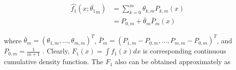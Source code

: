 \begin{comment}
As we chose Bernstein polynomial method and estimate the probability density function (PDF) $f_1(x) =F'_1(x)$ by the Bernstein estimator of $f$ of order $m > 0$ and $F_E$ denotes the empirical distribution function.

\begin{equation}
    \hat{f_1}_{m}(x) = \frac{d}{dx} \hat{F_1}_{m}=
    m\displaystyle\sum_{k=0}^{m-1}\left[F_{1 E }\left(\frac{k+1}{m}\right)-F_{1E }\left(\frac{k}{m}\right)\right] P_{k,m-1}(x)
\end{equation}

where $P_{k,m}(x) = \binom{m}{k} x^k(1-x)^{(m-k)}$ are binomial probabilities, and $F_E$ denotes as the empirical distribution function obtained. The integration of the estimator of $\hat{f_1}$ is


\begin{equation}
\hat{F_1}_{m,l}(x) = \int \hat{f_1}_{ m}(x) dx
\end{equation}

and $\hat{F_0}_{n}(x)$ is obtained similarly as  $\hat{F_1}_{m}(x)$ with $n$ of the Bernstein polynomial degree.



\begin{equation}
    \hat{f_0}_{n}(x) = \frac{d}{dx} \hat{F_0}_{n}=
    n\displaystyle\sum_{k=0}^{n-1}\theta_{k,n}\left[F_{0 E }\left(\frac{k+1}{n}\right)-F_{0E }\left(\frac{k}{n}\right)\right] P_{k,n-1}(x)
\end{equation}

$F_{0E}$ denotes as the empirical distribution of $F_0$  obtained. The integration of the estimator of $\hat{f_1}$ is


\begin{equation}
\hat{F_0}_{n}(x) = \int \hat{f_0}_{n}(x) dx
\end{equation}

\end{comment}


\begin{equation}
\begin{split}
\hat{f_1}(x;\bar{\theta_1}_m) & = \sum_{k=0}^{m}\theta_{k,m}P_{k,m}(x) \\
&= P_{0,m}+\bar{\theta}_m\bar{P}_m(x)
\end{split}
\end{equation}

where $\bar{\theta}_m = (\theta_{1,m}, ..., \theta_{m,m})^T$,  $\bar{P}_m = (P_{1,m}-P_{0,m}, ..., P_{m,m}-P_{0,m})^T$, and $P_{0,m}=\frac{1}{m+1}$ . Clearly, $F_1(x) = \int f_1(x)dx   $ is corresponding continuous cumulative density function.  The $F_1$ also can be obtained approximately as

